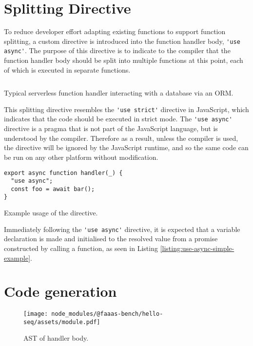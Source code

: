 \section{Splitting Directive}
To reduce developer effort adapting existing functions to support function splitting, a custom directive is introduced into the function handler body, \verb|'use async'|. The purpose of this directive is to indicate to the \faaasc{} compiler that the function handler body should be split into multiple functions at this point, each of which is executed in separate \awslambda{} functions.

\begin{listing}[H]
  \inputminted{javascript}{node_modules/@faaas-bench/hello-seq/src/onHttpGetHello.trigger.ts}
  \caption{Typical serverless function handler interacting with a database via an ORM.}
\end{listing}

This splitting directive resembles the \verb|'use strict'| directive in JavaScript, which indicates that the code should be executed in strict mode. The \verb|'use async'| directive is a pragma that is not part of the JavaScript language, but is understood by the \faaasc{} compiler. Therefore as a result, unless the \faaasc{} compiler is used, the directive will be ignored by the JavaScript runtime, and so the same code can be run on any other \faas{} platform without modification.

\begin{listing}[H]
\begin{verbatim}
export async function handler(_) {
  "use async";
  const foo = await bar();
}
\end{verbatim}
\caption{Example usage of the directive.}
\label{listing:use-async-simple-example}
\end{listing}

Immediately following the \verb|'use async'| directive, it is expected that a variable declaration is made and initialised to the resolved value from a promise constructed by calling a function, as seen in Listing \ref{listing:use-async-simple-example}.

\section{Code generation}
\label{sec:faaasc-codegen-ast}

\begin{figure}[t]
    \texttt{[image: node\_modules/@faaas-bench/hello-seq/assets/module.pdf]}
    \caption{AST of handler body.}
    \label{fig:suites-hello-seq-module-ast}
\end{figure}

